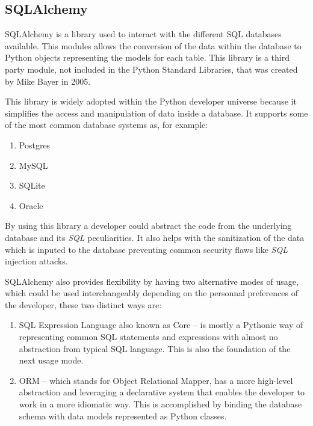
\subsection{SQLAlchemy}
\label{chap3:sec:tools:sub:sqlalcemy}
SQLAlchemy is a library used to interact with the different SQL databases
available. This modules allows the conversion of the data within the database to
Python objects representing the models for each table. This library is a third
party module, not included in the Python Standard Libraries, that was created by
Mike Bayer in 2005.

This library is widely adopted within the Python developer universe because it
simplifies the access and manipulation of data inside a database. It supports
some of the most common database systems as, for example:
\begin{enumerate}
	\item Postgres
	\item MySQL
	\item SQLite
	\item Oracle
\end{enumerate}
By using this library a developer could abstract the code from the underlying
database and its \emph{\ac{SQL}} peculiarities. It also helps with the
sanitization of the data which is inputed to the database preventing common
security flaws like \emph{\ac{SQL}} injection attacks.

SQLAlchemy also provides flexibility by having two alternative modes of usage,
which could be used interchangeably depending on the personnal preferences of
the developer, these two distinct ways are:
\begin{enumerate}
	\item SQL Expression Language also known as Core -- is mostly a Pythonic way
		of representing common SQL statements and expressions with almost no
		abstraction from typical SQL language. This is also the foundation of
		the next usage mode.
	\item ORM -- which stands for Object Relational Mapper, has a more
		high-level abstraction and leveraging a declarative system that enables
		the developer to work in a more idiomatic way. This is accomplished by
		binding the database schema with data models represented as Python
		classes.
\end{enumerate}

